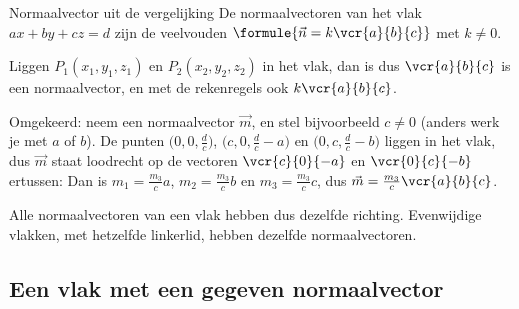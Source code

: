 \begin{theorie}
\begin{stelling}{Normaalvector uit de vergelijking}
De normaalvectoren van het vlak $ax + by + cz = d$ zijn de veelvouden $\formule{\vec n = k\vcr{a}{b}{c}}$ met $k \neq 0$.
\end{stelling}
\begin{bewijs}
Liggen $P_1(x_1, y_1, z_1)$ en $P_2(x_2, y_2, z_2)$ in het vlak, dan is
dus $\vcr{a}{b}{c}$ is een normaalvector, en met de rekenregels ook $k\vcr{a}{b}{c}$.

Omgekeerd: neem een normaalvector $\vec m$, en stel bijvoorbeeld $c \neq 0$ (anders werk je met $a$ of $b$). De punten $\bigl(0, 0, \frac dc\bigr)$, $\bigl(c, 0, \frac dc - a\bigr)$ en $\bigl(0, c, \frac dc - b\bigr)$ liggen in het vlak, dus $\vec m$ staat loodrecht op de vectoren $\vcr{c}{0}{-a}$ en $\vcr{0}{c}{-b}$ ertussen:
Dan is $m_1 = \frac{m_3}{c}a$, $m_2 = \frac{m_3}{c}b$ en $m_3 = \frac{m_3}{c}c$, dus $\vec m = \frac{m_3}{c}\vcr{a}{b}{c}$.
\end{bewijs}
\end{theorie}

Alle normaalvectoren van een vlak hebben dus dezelfde richting. Evenwijdige vlakken, met hetzelfde linkerlid, hebben dezelfde normaalvectoren.

\subsection{Een vlak met een gegeven normaalvector}

